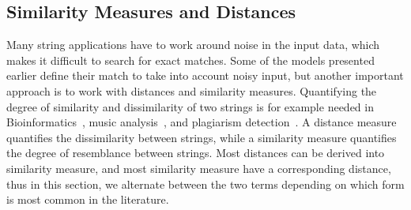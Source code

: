 \subsection{Similarity Measures and Distances}
Many string applications have to work around noise in the input data, which makes it difficult to search for exact matches. Some of the models presented earlier define their match to take into account noisy input, but another important approach is to work with distances and similarity measures. Quantifying the degree of similarity and dissimilarity of two strings is for example needed in Bioinformatics~\cite{Gusfield1997}, music analysis~\cite{mongeau1990comparison}, and plagiarism detection~\cite{lukashenko2007computer}. 
%
A distance measure quantifies the dissimilarity between strings, while a similarity measure quantifies the degree of resemblance between strings. Most distances can be derived into similarity measure, and most similarity measure have a corresponding distance, thus in this section, we alternate between the two terms depending on which form is most common in the literature.

